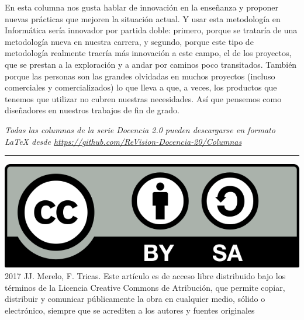 \documentclass[twoside,10pt]{article}
\newcommand{\surl}[1]{{\small\url{#1}}}
\begin{document}
\begin{multicols}{2}
En esta columna nos gusta hablar de innovación en la enseñanza y
proponer nuevas prácticas que mejoren la situación actual. Y usar esta
metodología en Informática sería innovador por partida doble: primero, porque
se trataría de una metodología nueva en nuestra carrera, y segundo, porque este
tipo de metodología realmente traería más innovación a este campo, el de los
proyectos, que se prestan a la exploración y a andar por caminos poco
transitados. También porque las personas son las grandes olvidadas en muchos
proyectos (incluso comerciales y comercializados) lo que lleva a que,
a veces, los productos que tenemos que utilizar no cubren nuestras
necesidades. Así que pensemos como diseñadores en nuestros trabajos de
fin de grado. 



\noindent 
\bigskip

\noindent\emph{Todas las columnas de la serie Docencia 2.0
pueden descargarse en formato LaTeX desde
\surl{https://github.com/ReVision-Docencia-20/Columnas}}

\noindent\rule{90mm}{1pt}

{\small \noindent\includegraphics[height = 4ex]{CC.png} 2017 JJ. Merelo, F. Tricas. Este artículo es de acceso libre distribuido bajo los términos
de la Licencia Creative Commons de Atribución, que permite copiar,
distribuir y comunicar públicamente la obra en cualquier medio, sólido
o electrónico, siempre que se acrediten a los autores y fuentes
originales}

\end{multicols}
\end{document}
